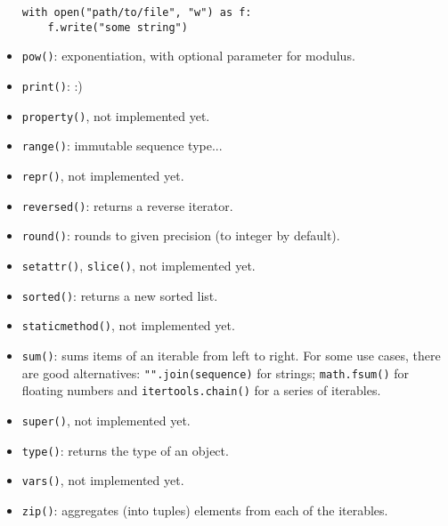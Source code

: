 \begin{itemize}
\begin{verbatim}
with open("path/to/file", "w") as f:
	f.write("some string")
\end{verbatim}

\item \texttt{pow()}: exponentiation, with optional parameter for modulus.

\item \texttt{print()}: :)

\item
\texttt{property()},
\dotfill not implemented yet.

\item \texttt{range()}: immutable sequence type...

\item
\texttt{repr()},
\dotfill not implemented yet.

\item \texttt{reversed()}: returns a reverse iterator.

\item \texttt{round()}: rounds to given precision (to integer by default).

\item
\texttt{setattr()},
\texttt{slice()},
\dotfill not implemented yet.

\item \texttt{sorted()}: returns a new sorted list.

\item
\texttt{staticmethod()},
\dotfill not implemented yet.

\item \texttt{sum()}: sums items of an iterable from left to right.
For some use cases, there are good alternatives: \texttt{"".join(sequence)} for strings; \texttt{math.fsum()} for floating numbers and \texttt{itertools.chain()} for a series of iterables.

\item
\texttt{super()},
\dotfill not implemented yet.

\item \texttt{type()}: returns the type of an object.

\item
\texttt{vars()},
\dotfill not implemented yet.

\item \texttt{zip()}: aggregates (into tuples) elements from each of the iterables.
\end{itemize}

%